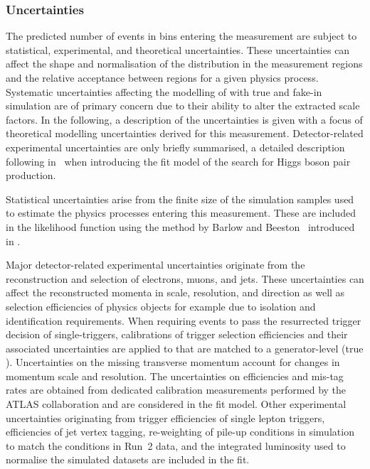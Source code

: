 \subsubsection{Uncertainties}

The predicted number of events in bins entering the measurement are
subject to statistical, experimental, and theoretical
uncertainties. These uncertainties can affect the shape and
normalisation of the \mTW distribution in the measurement regions and
the relative acceptance between regions for a given physics
process. Systematic uncertainties affecting the modelling of \ttbar
with true and fake-\tauhadvis in simulation are of primary concern due
to their ability to alter the extracted scale factors. In the
following, a description of the uncertainties is given with a focus of
theoretical modelling uncertainties derived for this
measurement. Detector-related experimental uncertainties are only
briefly summarised, a detailed description following
in~ when introducing the fit model of the
search for Higgs boson pair production.

Statistical uncertainties arise from the finite size of the simulation
samples used to estimate the physics processes entering this
measurement. These are included in the likelihood function using the
method by Barlow and Beeston~\cite{barlow1993,conway2011} introduced
in .

Major detector-related experimental uncertainties originate from the
reconstruction and selection of electrons, muons, \tauhadvis and jets.
These uncertainties can affect the reconstructed momenta in scale,
resolution, and direction as well as selection efficiencies of physics
objects for example due to isolation and identification
requirements. When requiring events to pass the resurrected trigger
decision of single-\tauhadvis triggers, calibrations of trigger
selection efficiencies and their associated uncertainties are applied
to \tauhadvis that are matched to a generator-level \tauhad (true
\tauhadvis). Uncertainties on the missing transverse momentum account
for changes in momentum scale and resolution. The uncertainties on
\btag efficiencies and mis-tag rates are obtained from dedicated
calibration measurements performed by the ATLAS collaboration and are
considered in the fit model. Other experimental uncertainties
originating from trigger efficiencies of single lepton triggers,
efficiencies of jet vertex tagging, re-weighting of pile-up conditions
in simulation to match the conditions in Run~2 data, and the
integrated luminosity used to normalise the simulated datasets are
included in the fit.


